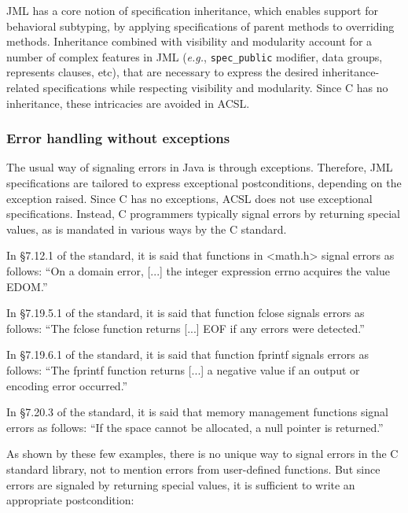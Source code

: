 JML has a core notion of specification inheritance, which
enables support for behavioral subtyping, by applying
 specifications of parent methods to overriding methods.  Inheritance
combined with visibility and modularity account for a number of
complex features in JML (\emph{e.g.}, \verb|spec_public| modifier, data
groups, represents clauses, etc), that are necessary to express the
desired inheritance-related specifications while respecting visibility
and modularity. Since C has no inheritance, these intricacies are
avoided in ACSL.

\subsubsection*{Error handling without exceptions}
\label{sec:errorhandling}

The usual way of signaling errors in Java is through
exceptions. Therefore, JML specifications are tailored to express
exceptional postconditions, depending on the exception raised. Since C
has no exceptions, ACSL does not use exceptional
specifications. Instead, C programmers typically signal errors by
returning special values, as is mandated in various ways by the C standard.

\begin{example}
In \S 7.12.1 of the standard, it is said that functions in <math.h>
signal errors as follows:
``On a domain error, [...] the integer expression errno
acquires the value EDOM.''
\end{example}

\begin{example}
In \S 7.19.5.1 of the standard, it is said that function fclose signals
errors as follows:
``The fclose function returns [...] EOF if any errors were detected.''
\end{example}

\begin{example}
In \S 7.19.6.1 of the standard, it is said that function fprintf
signals errors as follows:
``The fprintf function returns [...] a negative value if an output or
encoding error occurred.''
\end{example}

\begin{example}
In \S 7.20.3 of the standard, it is said that memory management functions
signal errors as follows:
``If the space cannot be allocated, a null pointer is returned.''
\end{example}

As shown by these few examples, there is no unique way to signal
errors in the C standard library, not to mention errors from user-defined
functions. But since errors are signaled by returning special values, it
is sufficient to write an appropriate postcondition:


